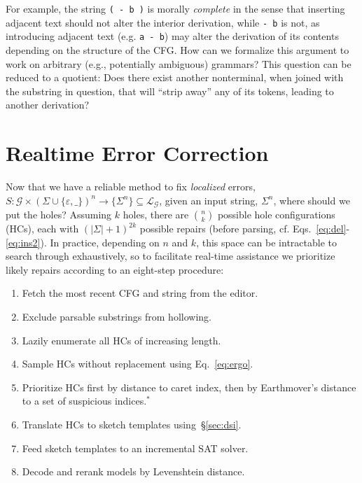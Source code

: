 \documentclass[sigplan,review,anonymous,acmsmall]{acmart}\settopmatter{printfolios=false,printccs=false,printacmref=false}
\begin{document}
    For example, the string \texttt{( - b )} is morally \textit{complete} in the sense that inserting adjacent text should not alter the interior derivation, while \texttt{- b} is not, as introducing adjacent text (e.g. \texttt{a - b}) may alter the derivation of its contents depending on the structure of the CFG. How can we formalize this argument to work on arbitrary (e.g., potentially ambiguous) grammars? This question can be reduced to a quotient: Does there exist another nonterminal, when joined with the substring in question, that will ``strip away'' any of its tokens, leading to another derivation?

    \section{Realtime Error Correction}\label{sec:holes}

    Now that we have a reliable method to fix \textit{localized} errors, $S: \mathcal{G} \times (\Sigma\cup\{\varepsilon, \texttt{\_}\})^n \rightarrow \{\Sigma^n\}\subseteq \mathcal{L}_\mathcal{G}$, given an input string, $\Sigma^n$, where should we put the holes? Assuming $k$ holes, there are ${n \choose k}$ possible hole configurations (HCs), each with $(|\Sigma| + 1)^{2k}$ possible repairs (before parsing, cf. Eqs.~\ref{eq:del}-\ref{eq:ins2}). In practice, depending on $n$ and $k$, this space can be intractable to search through exhaustively, so to facilitate real-time assistance we prioritize likely repairs according to an eight-step procedure:

    \begin{enumerate}
        \item Fetch the most recent CFG and string from the editor.
        \item Exclude parsable substrings from hollowing.
        \item Lazily enumerate all HCs of increasing length.
        \item Sample HCs without replacement using Eq.~\ref{eq:ergo}.
        \item Prioritize HCs first by distance to caret index, then by Earthmover's distance to a set of suspicious indices.$^*$
        \item Translate HCs to sketch templates using~\S\ref{sec:dsi}.
        \item Feed sketch templates to an incremental SAT solver.
        \item Decode and rerank models by Levenshtein distance.
    \end{enumerate}
\end{document}
